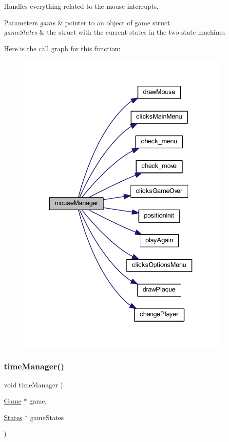 Handles everything related to the mouse interrupts. 


\begin{DoxyParams}{Parameters}
{\em game} & pointer to an object of game struct \\
\hline
{\em game\+States} & the struct with the current states in the two state machines \\
\hline
\end{DoxyParams}
Here is the call graph for this function\+:
\nopagebreak
\begin{figure}[H]
\begin{center}
\leavevmode
\includegraphics[width=299pt]{group___x_mas_run_ga1b1dcdb3762a6408c2b5ad053e0848eb_cgraph}
\end{center}
\end{figure}
\mbox{\label{group___x_mas_run_gaa7d8686bcb6a92421aeba74757c6cabb}} 
\subsubsection{\texorpdfstring{time\+Manager()}{timeManager()}}
{\footnotesize\ttfamily void time\+Manager (\begin{DoxyParamCaption}\item[{\hyperlink{struct_game}{Game} $\ast$}]{game,  }\item[{\hyperlink{struct_states}{States} $\ast$}]{game\+States }\end{DoxyParamCaption})}



